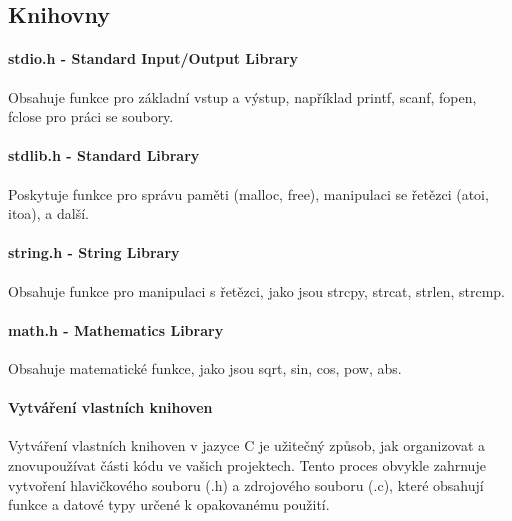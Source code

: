 \subsection{Knihovny}

\paragraph{stdio.h - Standard Input/Output Library}
Obsahuje funkce pro základní vstup a výstup, například printf, scanf, fopen, fclose pro práci se soubory.

\paragraph{stdlib.h - Standard Library}
Poskytuje funkce pro správu paměti (malloc, free), manipulaci se řetězci (atoi, itoa), a další.

\paragraph{string.h - String Library}
Obsahuje funkce pro manipulaci s řetězci, jako jsou strcpy, strcat, strlen, strcmp.

\paragraph{math.h - Mathematics Library}
Obsahuje matematické funkce, jako jsou sqrt, sin, cos, pow, abs.

\paragraph{Vytváření vlastních knihoven}
Vytváření vlastních knihoven v jazyce C je užitečný způsob, jak organizovat a znovupoužívat části kódu ve vašich projektech. Tento proces obvykle zahrnuje vytvoření hlavičkového souboru (.h) a zdrojového souboru (.c), které obsahují funkce a datové typy určené k opakovanému použití.